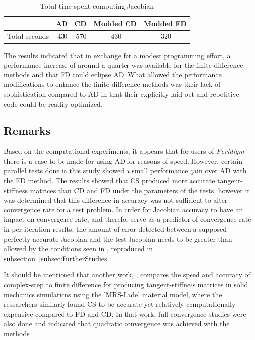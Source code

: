\documentclass[preprint,12pt]{elsarticle}
\begin{document}
\begin{table}[!ht]   
\centering \caption{Total time spent computing Jacobian} 
\label{tab:PerformanceMod}   
\begin{tabular}{c c c c c}
\toprule & AD & CD & Modded CD & Modded FD\\
\midrule  Total seconds & $~430$ & $~570$ & $~430$ &$~320$ \\ 
\bottomrule \end{tabular} \end{table}

The results indicated that in exchange for a modest programming effort, a
performance increase of around a quarter was available for the
finite difference methods and that FD could eclipse AD. What allowed the performance modifications to
enhance the finite difference methods was their lack of sophistication
compared to AD in that their explicitly laid out and
repetitive code could be readily optimized. 

\subsection{Remarks}
Based on the computational experiments, it appears that for users of \emph{Peridigm}
there is a case to be made for using AD for reasons of speed. However, certain
parallel tests done in this study showed a small performance gain over AD with
the FD method.  The results showed that CS produced more accurate
tangent-stiffness matrices than CD and FD under the parameters of the tests,
however it was determined that this difference in accuracy was not sufficient
to alter convergence rate for a test problem. In order for Jacobian accuracy to
have an impact on convergence rate, and therefor serve as a predictor of
convergence rate in per-iteration results, the amount of error detected between
a supposed perfectly accurate Jacobian and the test Jacobian needs to be
greater than allowed by the conditions seen in \cite{burkeLectures}, 
reproduced in subsection~\ref{subsec:FurtherStudies}. 

It should be mentioned that another work, \cite{perez2012numerical}, compares
the speed and accuracy of complex-step to finite difference for producing
tangent-stiffness matrices in solid mechanics simulations using the 'MRS-Lade'
material model, where the researchers similarly found CS to be accurate yet
relatively computationally expensive compared to FD and CD. In that work, full
convergence studies were also done and indicated that quadratic convergence was
achieved with the methods \cite[p.28]{perez2012numerical}.
\end{document}

